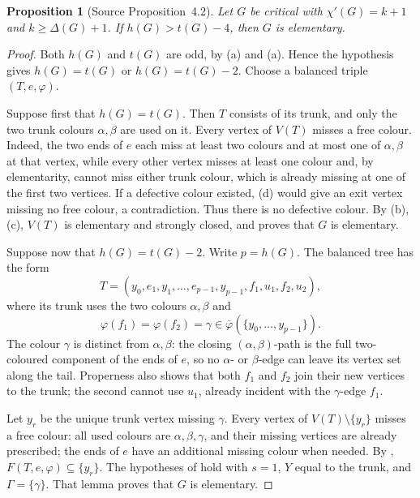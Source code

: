 \documentclass[11pt]{article}
\newtheorem{proposition}[proposition]{Proposition}
\theoremstyle{definition}
\newcommand{\set}[1]{\{#1\}}
\newcommand{\comp}{\mathbin{\setminus}}
\begin{document}
\begin{proposition}[Source Proposition~4.2]
\label{Scheide-Proposition-4.2}\label{large-height}
Let $G$ be critical with $\chi'(G)=k+1$ and $k\ge\Delta(G)+1$. If
$h(G)>t(G)-4$, then $G$ is elementary.
\end{proposition}

\begin{proof}
Both $h(G)$ and $t(G)$ are odd, by (a) and
(a). Hence the hypothesis gives
$h(G)=t(G)$ or $h(G)=t(G)-2$. Choose a balanced triple
$(T,e,\varphi)$.

Suppose first that $h(G)=t(G)$. Then $T$ consists of its trunk, and only the
two trunk colours $\alpha,\beta$ are used on it. Every vertex of $V(T)$
misses a free colour. Indeed, the two ends of $e$ each miss at least two
colours and at most one of $\alpha,\beta$ at that vertex, while every other
vertex misses at least one colour and, by elementarity, cannot miss either
trunk colour, which is already missing at one of the first two vertices. If
a defective colour existed, (d) would give an exit
vertex missing no free colour, a contradiction. Thus there is no defective
colour. By (b),(c), $V(T)$ is elementary and
strongly closed, and  proves that $G$ is elementary.

Suppose now that $h(G)=t(G)-2$. Write $p=h(G)$. The balanced tree has the
form
\[
 T=(y_0,e_1,y_1,\ldots,e_{p-1},y_{p-1},f_1,u_1,f_2,u_2),
\]
where its trunk uses the two colours $\alpha,\beta$ and
\[
 \varphi(f_1)=\varphi(f_2)=\gamma
 \in\overline\varphi(\set{y_0,\ldots,y_{p-1}}).
\]
The colour $\gamma$ is distinct from $\alpha,\beta$: the closing
$(\alpha,\beta)$-path is the full two-coloured component of the ends of
$e$, so no $\alpha$- or $\beta$-edge can leave its vertex set along the
tail. Properness also shows that both $f_1$ and $f_2$ join their new
vertices to the trunk; the second cannot use $u_1$, already incident with
the $\gamma$-edge $f_1$.

Let $y_r$ be the unique trunk vertex missing $\gamma$. Every vertex of
$V(T)\comp\set{y_r}$ misses a free colour: all used colours are
$\alpha,\beta,\gamma$, and their missing vertices are already prescribed;
the ends of $e$ have an additional missing colour when needed. By
, $F(T,e,\varphi)\subseteq\set{y_r}$. The hypotheses of
 hold with $s=1$, $Y$ equal to the trunk, and
$\Gamma=\set{\gamma}$. That lemma proves that $G$ is elementary.
\end{proof}
\end{document}
